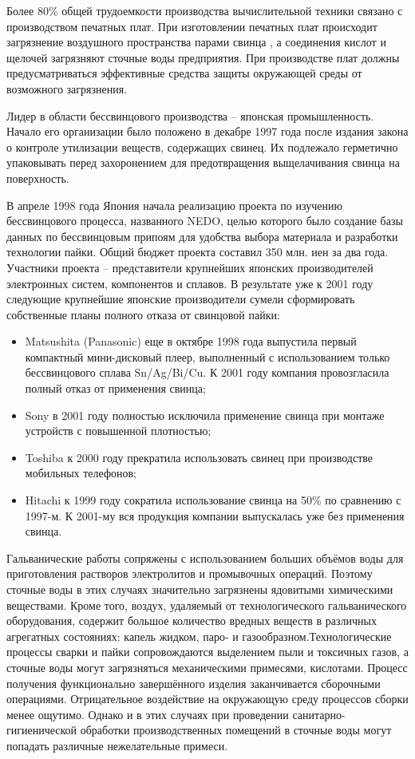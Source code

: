 Более 80\% общей трудоемкости производства вычислительной техники связано с производством печатных плат.
При изготовлении печатных плат происходит загрязнение воздушного пространства парами свинца \cite{bjd43}, а соединения кислот и
щелочей загрязняют сточные воды предприятия. При производстве плат должны предусматриваться эффективные средства
защиты окружающей среды от возможного загрязнения.

Лидер в области бессвинцового производства – японская промышленность. Начало его организации было положено в декабре 1997 года
после издания закона о контроле утилизации веществ, содержащих свинец. Их подлежало герметично упаковывать перед захоронением
для предотвращения выщелачивания свинца на поверхность.

В апреле 1998 года Япония начала реализацию проекта по изучению бессвинцового процесса, названного NEDO, целью которого было
создание базы данных по бессвинцовым припоям для удобства выбора материала и разработки технологии пайки.
Общий бюджет проекта составил 350 млн. иен за два года. Участники проекта – представители крупнейших японских
производителей электронных систем, компонентов и сплавов. В результате уже к 2001 году следующие крупнейшие японские
производители сумели сформировать собственные планы полного отказа от свинцовой пайки:
\begin{itemize}
\item Matsushita (Panasonic) еще в октябре 1998 года выпустила первый компактный мини-дисковый плеер, выполненный с
	использованием только бессвинцового сплава Sn/Ag/Bi/Cu. К 2001 году компания провозгласила полный отказ от применения свинца;
\item Sony в 2001 году полностью исключила применение свинца при монтаже устройств с повышенной плотностью;
\item Toshiba к 2000 году прекратила использовать свинец при производстве мобильных телефонов;
\item Hitachi к 1999 году сократила использование свинца на 50\% по сравнению с 1997-м. К 2001-му вся продукция компании
	выпускалась уже без применения свинца.
\end{itemize}

Гальванические работы сопряжены с использованием больших объёмов воды для приготовления растворов электролитов и
промывочных операций. Поэтому сточные воды в этих случаях значительно загрязнены ядовитыми химическими веществами.
Кроме того, воздух, удаляемый от технологического гальванического оборудования, содержит большое количество вредных
веществ в различных агрегатных состояниях: капель жидком, паро- и газообразном.Технологические процессы сварки и
пайки сопровождаются выделением пыли и токсичных газов, а сточные воды могут загрязняться механическими примесями,
кислотами. Процесс получения функционально завершённого изделия заканчивается сборочными операциями. Отрицательное
воздействие на окружающую среду процессов сборки менее ощутимо. Однако и в этих случаях при проведении
санитарно-гигиенической обработки производственных помещений в сточные воды могут попадать различные нежелательные примеси.

